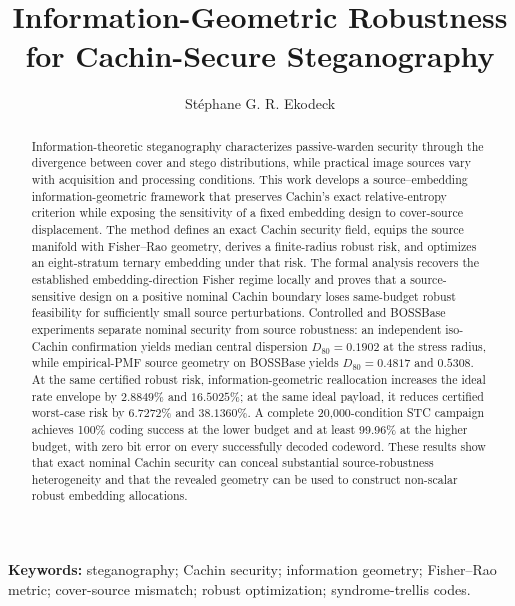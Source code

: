 \documentclass[10pt]{article}
\title{Information-Geometric Robustness for Cachin-Secure Steganography}
\author{St\'ephane G. R. Ekodeck}
\date{}
\begin{document}
\maketitle

\begin{abstract}
Information-theoretic steganography characterizes passive-warden security through the divergence between cover and stego distributions, while practical image sources vary with acquisition and processing conditions. This work develops a source--embedding information-geometric framework that preserves Cachin's exact relative-entropy criterion while exposing the sensitivity of a fixed embedding design to cover-source displacement. The method defines an exact Cachin security field, equips the source manifold with Fisher--Rao geometry, derives a finite-radius robust risk, and optimizes an eight-stratum ternary embedding under that risk. The formal analysis recovers the established embedding-direction Fisher regime locally and proves that a source-sensitive design on a positive nominal Cachin boundary loses same-budget robust feasibility for sufficiently small source perturbations. Controlled and BOSSBase experiments separate nominal security from source robustness: an independent iso-Cachin confirmation yields median central dispersion \(D_{80}=0.1902\) at the stress radius, while empirical-PMF source geometry on BOSSBase yields \(D_{80}=0.4817\) and \(0.5308\). At the same certified robust risk, information-geometric reallocation increases the ideal rate envelope by \(2.8849\%\) and \(16.5025\%\); at the same ideal payload, it reduces certified worst-case risk by \(6.7272\%\) and \(38.1360\%\). A complete 20,000-condition STC campaign achieves 100\% coding success at the lower budget and at least 99.96\% at the higher budget, with zero bit error on every successfully decoded codeword. These results show that exact nominal Cachin security can conceal substantial source-robustness heterogeneity and that the revealed geometry can be used to construct non-scalar robust embedding allocations.
\end{abstract}

\noindent\textbf{Keywords:} steganography; Cachin security; information geometry; Fisher--Rao metric; cover-source mismatch; robust optimization; syndrome-trellis codes.
\end{document}
